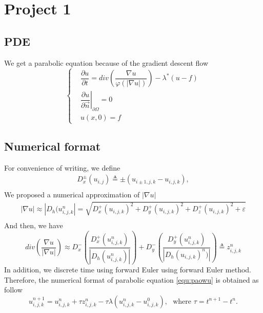 \documentclass{article}
\begin{document}
\section{Project 1}
\subsection{PDE}
We get a parabolic equation because of the gradient descent flow 
\begin{equation}\label{equ:paowu}
  \left\{
  \begin{split}
    &\dfrac{\partial u}{\partial t}=div\left (\dfrac{\nabla u}{\varphi(|\nabla u|)}\right)-\lambda^*(u-f) \\
    &\left. \dfrac{\partial u}{\partial \overrightarrow{n}} \right | _{\partial \Omega} =0\\
    &u(x,0)=f
  \end{split}
  \right.
\end{equation}


\subsection{Numerical format}
For convenience of writing, we define
\begin{equation*}
  \begin{array}{c}
      D_x^{\pm}(u_{i,j}) \triangleq \pm (u_{i\pm1,j,k}-u_{i,j,k}),\\
   \end{array}
\end{equation*}
We proposed a numerical approximation of $|\nabla u|$
\begin{equation*}
  \begin{array}{c}
    |\nabla u|\approx  |D_h(u_{i,j,k}^n| =  \sqrt{D_x ^+ (u_{i,j,k})^2+D_y^+(u_{i,j,k})^2+D_z^+(u_{i,j,k})^2+\varepsilon}\\
  \end{array}
\end{equation*}
And then, we have
\begin{equation}\label{equ:div1}
  div\left (\frac{\nabla u}{|\nabla u|}\right) \approx D_x^-\left(\frac{D_x^+(u_{i,j,k}^n)}{|D_h(u_{i,j,k}^n)|}\right)+D_y^-
  \left(\frac{D_y^+(u_{i,j,k}^n)}{|D_h(u_{i,j,k})^n)|}\right) \triangleq z_{i,j,k}^n
\end{equation}
In addition, we discrete time using forward Euler using forward Euler method. Therefore, the numerical format of parabolic equation \eqref{equ:paowu} is obtained as follow
\begin{equation}\label{equ:shuzhi1}
  u_{i,j,k}^{n+1}=u_{i,j,k}^n +\tau z_{i,j,k}^n-\tau \lambda (u_{i,j,k}^n-u_{i,j,k}^0),\ \ \ \text{where }\tau = t^{n+1}-t^n.
\end{equation}
\end{document}
